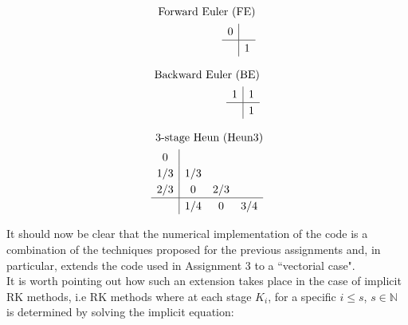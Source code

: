 \documentclass[11pt]{article}
\theoremstyle{theorem}
\theoremstyle{definition}
\begin{document}
\begin{center}
	\begin{minipage}{0.3\linewidth}
		\begin{align*}
		\renewcommand\arraystretch{1.2}
		\textnormal{Forward Euler (FE)} \\
		\begin{array}
		{c|c}
		0 &
		\\
		\hline
		& 1
		\end{array}
		\end{align*}
	\end{minipage}
	\begin{minipage}{0.3\linewidth}
		\begin{align*}
		\renewcommand\arraystretch{1.2}
		\textnormal{Backward Euler (BE)} \\
		\begin{array}
		{c|c}
		1 & 1
		\\
		\hline
		& 1
		\end{array}
		\end{align*}
	\end{minipage}
	\begin{minipage}{0.3\linewidth}
		\begin{align*}
		\renewcommand\arraystretch{1.2}
		\textnormal{3-stage Heun (Heun3)} \\
		\begin{array}
		{c|ccc}
		0 & & \\
		1/3 & 1/3 & \\
		2/3 & 0 & 2/3 \\
		\hline
		& 1/4 & 0 & 3/4
		\end{array}
		\end{align*}
	\end{minipage}
\end{center}

It should now be clear that the numerical implementation of the code is a combination of the techniques proposed for the previous assignments and, in particular, extends the code used in Assignment 3 to a ``vectorial case".\\
It is worth pointing out how such an extension takes place in the case of implicit RK methods, i.e RK methods where at each stage $ K_i $, for a specific $ i \leq s $, $s\in\mathbb{N}$ is determined by solving the implicit equation:
\end{document}
